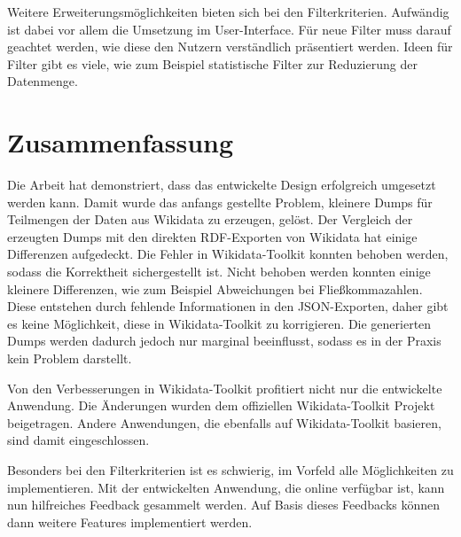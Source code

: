 Weitere Erweiterungsmöglichkeiten bieten sich bei den Filterkriterien. 
Aufwändig ist dabei vor allem die Umsetzung im User-Interface.
Für neue Filter muss darauf geachtet werden, wie diese den Nutzern verständlich präsentiert werden.
Ideen für Filter gibt es viele, wie zum Beispiel statistische Filter zur Reduzierung der Datenmenge.

\section{Zusammenfassung}
Die Arbeit hat demonstriert, dass das entwickelte Design erfolgreich umgesetzt werden kann.
Damit wurde das anfangs gestellte Problem, kleinere Dumps für Teilmengen der Daten aus Wikidata zu erzeugen, gelöst.
Der Vergleich der erzeugten Dumps mit den direkten RDF-Exporten von Wikidata hat einige Differenzen aufgedeckt.
Die Fehler in Wikidata-Toolkit konnten behoben werden, sodass die Korrektheit sichergestellt ist.
Nicht behoben werden konnten einige kleinere Differenzen, wie zum Beispiel Abweichungen bei Fließkommazahlen.
Diese entstehen durch fehlende Informationen in den JSON-Exporten, daher gibt es keine Möglichkeit, diese in Wikidata-Toolkit zu korrigieren.
Die generierten Dumps werden dadurch jedoch nur marginal beeinflusst, sodass es in der Praxis kein Problem darstellt.

Von den Verbesserungen in Wikidata-Toolkit profitiert nicht nur die entwickelte Anwendung.
Die Änderungen wurden dem offiziellen Wikidata-Toolkit Projekt beigetragen.
Andere Anwendungen, die ebenfalls auf Wikidata-Toolkit basieren, sind damit eingeschlossen.

Besonders bei den Filterkriterien ist es schwierig, im Vorfeld alle Möglichkeiten zu implementieren.
Mit der entwickelten Anwendung, die online verfügbar ist, kann nun hilfreiches Feedback gesammelt werden.
Auf Basis dieses Feedbacks können dann weitere Features implementiert werden.




